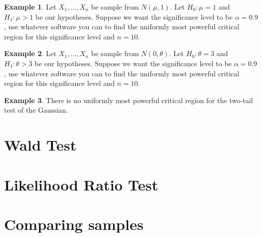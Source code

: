 \documentclass[
  openany]{book}
\theoremstyle{definition}
\theoremstyle{definition}
\newtheorem{example}{Example}[chapter]
\theoremstyle{definition}
\theoremstyle{definition}
\theoremstyle{remark}
\begin{document}
\begin{example}
Let \(X_1, \dots, X_n\) be sample from \(N(\mu, 1)\).
Let \(H_0: \mu = 1\) and \(H_1: \mu >1\) be our hypotheses.
Suppose we want the significance level to be \(\alpha = 0.9\),
use whatever software you can to find the uniformly most
powerful critical region for this significance level and \(n = 10\).
\end{example}

\begin{example}
Let \(X_1, \dots, X_n\) be sample from \(N(0, \theta)\).
Let \(H_0: \theta = 3\) and \(H_1: \theta >3\) be our hypotheses.
Suppose we want the significance level to be \(\alpha = 0.9\),
use whatever software you can to find the uniformly most
powerful critical region for this significance level and \(n = 10\).
\end{example}

\begin{example}
There is no uniformly most powerful critical region for the two-tail test of the Gaussian.
\end{example}

\hypertarget{wald-test}{%
\section{Wald Test}\label{wald-test}}

\hypertarget{likelihood-ratio-test}{%
\section{Likelihood Ratio Test}\label{likelihood-ratio-test}}

\hypertarget{comparing-samples}{%
\section{Comparing samples}\label{comparing-samples}}

  
\end{document}
